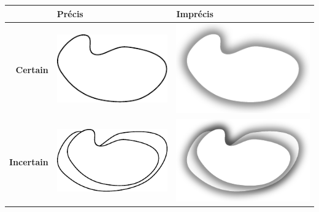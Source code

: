 \begin{tabular}{rC{5cm}C{5cm}}
  \toprule
  & \textbf{Précis} & \textbf{Imprécis} \\
  \midrule
  \textbf{Certain} &\includegraphics{../figures/incVSimpP1.pdf} & \includegraphics{../figures/incVSimpP2.pdf}\\
  \textbf{Incertain} &\includegraphics{../figures/incVSimpP3.pdf} & \includegraphics{../figures/incVSimpP4.pdf}\\
  \bottomrule
\end{tabular}
